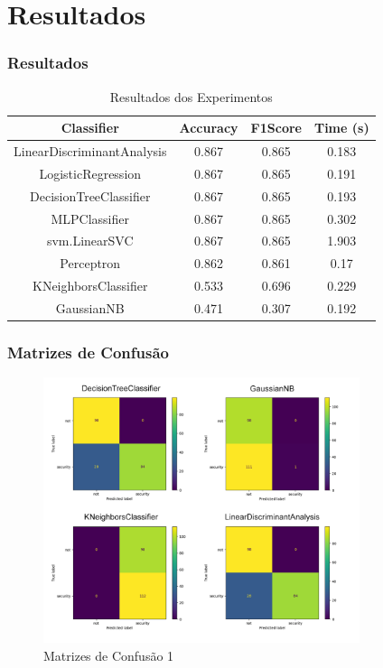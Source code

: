 \section[Resultados]{Resultados}

\begin{frame}
  \frametitle{Resultados}
  \begin{table}[!htb]
    \centering
    \begin{tabular}{|c|c|c|c|}
      \hline
      \textbf{Classifier}        & \textbf{Accuracy} & \textbf{F1Score} & \textbf{Time (s)} \\ \hline
      LinearDiscriminantAnalysis & 0.867             & 0.865            & 0.183             \\ \hline
      LogisticRegression         & 0.867             & 0.865            & 0.191             \\ \hline
      DecisionTreeClassifier     & 0.867             & 0.865            & 0.193             \\ \hline
      MLPClassifier              & 0.867             & 0.865            & 0.302             \\ \hline
      svm.LinearSVC              & 0.867             & 0.865            & 1.903             \\ \hline
      Perceptron                 & 0.862             & 0.861            & 0.17              \\ \hline
      KNeighborsClassifier       & 0.533             & 0.696            & 0.229             \\ \hline
      GaussianNB                 & 0.471             & 0.307            & 0.192             \\ \hline
    \end{tabular}
    \vspace{0.2cm}
    \caption{Resultados dos Experimentos}
    \label{tab:resultados_experimentos}
  \end{table}
\end{frame}

\begin{frame}
  \frametitle{Matrizes de Confusão}
  \begin{figure}[htbp]
    \centerline{\includegraphics[width=25em]{../report/images/conf_mat_1.png}}
    \caption{Matrizes de Confusão 1}
    \label{fig:conf_mat_1}
  \end{figure}
\end{frame}


